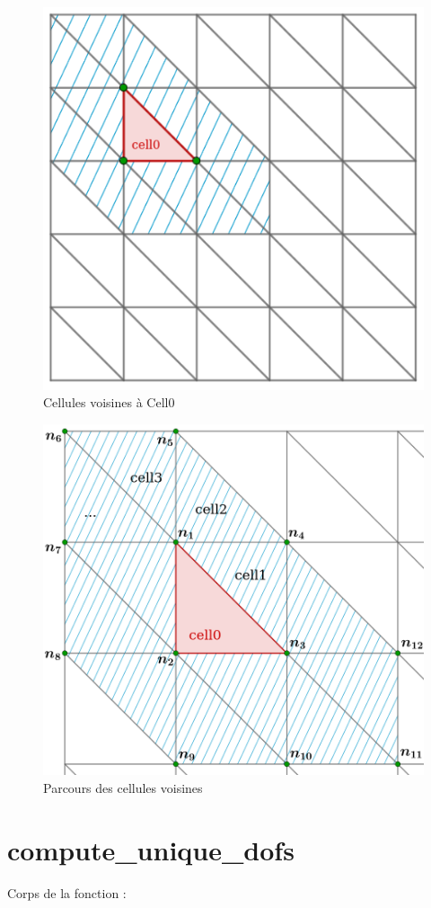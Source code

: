 \documentclass[french]{article}
\begin{document}
	\begin{minipage}{0.48\linewidth}
		\begin{figure}[H]
			\centering
			\includegraphics[width=0.6\linewidth]{surrounding_cells.png}
			\caption{Cellules voisines à Cell0}
			\label{fig3}
		\end{figure}
	\end{minipage}
	\begin{minipage}{0.48\linewidth}
		\begin{figure}[H]
			\centering
			\includegraphics[width=0.6\linewidth]{cell2dof2row.png}
			\caption{Parcours des cellules voisines}
			\label{fig4}
		\end{figure}
	\end{minipage}
	
	
	\section{compute\_unique\_dofs}
	\label{compute_unique_dofs}
	
	Corps de la fonction :
	
\end{document}
